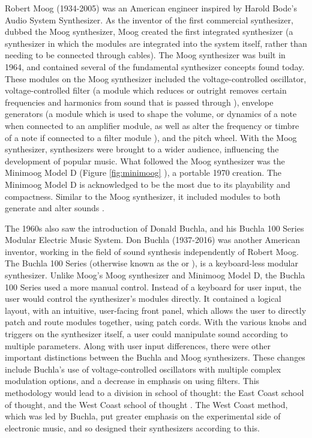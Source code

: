 Robert Moog (1934-2005) was an American engineer inspired by Harold Bode's Audio System Synthesizer. As the inventor of the first commercial synthesizer, dubbed the Moog synthesizer, Moog created the first integrated synthesizer (a synthesizer in which the modules are integrated into the system itself, rather than needing to be connected through cables). The Moog synthesizer was built in 1964, and contained several of the fundamental synthesizer concepts found today\cite{Pinch_Trocco_2004}. These modules on the Moog synthesizer included the voltage-controlled oscillator, voltage-controlled filter (a module which reduces or outright removes certain frequencies and harmonics from sound that is passed through \cite{Meyer_2016}), envelope generators (a module which is used to shape the volume, or dynamics of a note when connected to an amplifier module, as well as alter the frequency or timbre of a note if connected to a filter module \cite{Meyer_2016}), and the pitch wheel. With the Moog synthesizer, synthesizers were brought to a wider audience, influencing the development of popular music\cite{Pinch_Trocco_2004}. What followed the Moog synthesizer was the Minimoog Model D (Figure \ref{fig:minimoog} \cite{Krash_2005}), a portable 1970 creation. The Minimoog Model D is acknowledged to be the most \cite{Gabrielli_2020} due to its playability and compactness. Similar to the Moog synthesizer, it included modules to both generate and alter sounds \cite{Pinch_Trocco_2002}.

The 1960s also saw the introduction of Donald  Buchla, and his Buchla 100 Series Modular Electric Music System. Don Buchla (1937-2016) was another American inventor, working in the field of sound synthesis independently of Robert Moog. The Buchla 100 Series (otherwise known as the  or ), is a keyboard-less modular synthesizer. Unlike Moog's Moog synthesizer and Minimoog Model D, the Buchla 100 Series used a more manual control\cite{Pinch_Trocco_1998}. Instead of a keyboard for user input, the user would control the synthesizer's modules directly. It contained a logical layout, with an intuitive, user-facing front panel, which allows the user to directly patch and route modules together, using patch cords. With the various knobs and triggers on the synthesizer itself, a user could manipulate sound according to multiple parameters. Along with user input differences, there were other important distinctions between the Buchla and Moog synthesizers. These changes include Buchla's use of voltage-controlled oscillators with multiple complex modulation options, and a decrease in emphasis on using filters. This methodology would lead to a division in school of thought: the East Coast school of thought, and the West Coast school of thought \cite{Gabrielli_2020}. The West Coast method, which was led by Buchla, put greater emphasis on the experimental side of electronic music, and so designed their synthesizers according to this.

